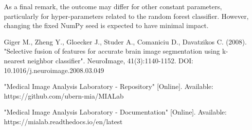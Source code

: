 \documentclass[conference]{IEEEtran}
\begin{document}
As a final remark, the outcome may differ for other constant parameters, particularly for hyper-parameters related to the random forest classifier. However, changing the fixed NumPy seed is expected to have minimal impact.


\begin{thebibliography}{00}

 Giger M., Zheng Y., Gloecker J., Studer A., Comaniciu D., Davatzikos C. (2008). "Selective fusion of features for accurate brain image segmentation using k-nearest neighbor classifier". NeuroImage, 41(3):1140-1152. DOI: 10.1016/j.neuroimage.2008.03.049

 "Medical Image Analysis Laboratory - Repository" [Online]. Available: https://github.com/ubern-mia/MIALab

 "Medical Image Analysis Laboratory - Documentation" [Online]. Available: https://mialab.readthedocs.io/en/latest


\end{thebibliography}

\clearpage
\onecolumn 

\appendix
\end{document}
